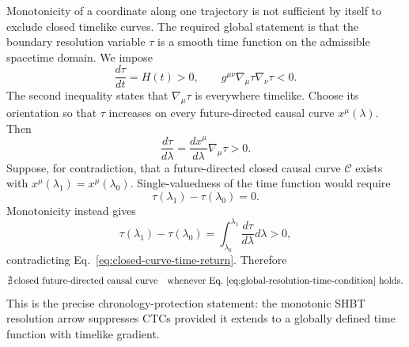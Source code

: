 Monotonicity of a coordinate along one trajectory is not sufficient by itself
to exclude closed timelike curves.  The required global statement is that the
boundary resolution variable \(\tau\) is a smooth time function on the
admissible spacetime domain.  We impose
\begin{equation}
  \frac{d\tau}{dt}
  =
  H(t)
  >0,
  \qquad
  g^{\mu\nu}
  \nabla_\mu\tau
  \nabla_\nu\tau
  <0.
  \label{eq:global-resolution-time-condition}
\end{equation}
The second inequality states that \(\nabla_\mu\tau\) is everywhere timelike.
Choose its orientation so that \(\tau\) increases on every future-directed
causal curve \(x^\mu(\lambda)\).  Then
\begin{equation}
  \frac{d\tau}{d\lambda}
  =
  \frac{dx^\mu}{d\lambda}
  \nabla_\mu\tau
  >0.
  \label{eq:resolution-increases-on-causal-curves}
\end{equation}
Suppose, for contradiction, that a future-directed closed causal curve
\(\mathcal C\) exists with
\(x^\mu(\lambda_1)=x^\mu(\lambda_0)\).  Single-valuedness of the time function
would require
\begin{equation}
  \tau(\lambda_1)-\tau(\lambda_0)
  =
  0.
  \label{eq:closed-curve-time-return}
\end{equation}
Monotonicity instead gives
\begin{equation}
  \tau(\lambda_1)-\tau(\lambda_0)
  =
  \int_{\lambda_0}^{\lambda_1}
  \frac{d\tau}{d\lambda}
  d\lambda
  >0,
  \label{eq:closed-curve-contradiction}
\end{equation}
contradicting Eq.~\eqref{eq:closed-curve-time-return}.  Therefore
\begin{equation}
  \nexists\,
  \text{closed future-directed causal curve}
  \quad
  \text{whenever Eq.~\eqref{eq:global-resolution-time-condition} holds}.
  \label{eq:ctc-exclusion-theorem}
\end{equation}
This is the precise chronology-protection statement: the monotonic SHBT
resolution arrow suppresses CTCs provided it extends to a globally defined
time function with timelike gradient.